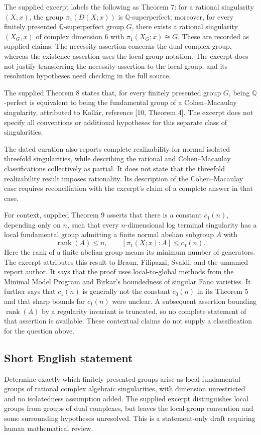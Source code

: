 \documentclass[11pt]{article}
\newcommand{\Q}{\mathbb{Q}}
\begin{document}
The supplied excerpt labels the following as Theorem 7: for a rational singularity \((X,x)\), the group \(\pi_1(D(X;x))\) is \(\Q\)-superperfect; moreover, for every finitely presented \(\Q\)-superperfect group \(G\), there exists a rational singularity \((X_G,x)\) of complex dimension \(6\) with \(\pi_1(X_G;x)\cong G\). These are recorded as supplied claims. The necessity assertion concerns the dual-complex group, whereas the existence assertion uses the local-group notation. The excerpt does not justify transferring the necessity assertion to the local group, and its resolution hypotheses need checking in the full source.

The supplied Theorem 8 states that, for every finitely presented group \(G\), being \(\Q\)-perfect is equivalent to being the fundamental group of a Cohen--Macaulay singularity, attributed to Koll\'ar, reference [10, Theorem 4]. The excerpt does not specify all conventions or additional hypotheses for this separate class of singularities.

The dated curation also reports complete realizability for normal isolated threefold singularities, while describing the rational and Cohen--Macaulay classifications collectively as partial. It does not state that the threefold realizability result imposes rationality. Its description of the Cohen--Macaulay case requires reconciliation with the excerpt's claim of a complete answer in that case.

For context, supplied Theorem 9 asserts that there is a constant \(c_1(n)\), depending only on \(n\), such that every \(n\)-dimensional log terminal singularity has a local fundamental group admitting a finite normal abelian subgroup \(A\) with
\[
\operatorname{rank}(A)\le n,
\qquad
[\pi_1(X;x):A]\le c_1(n).
\]
Here the rank of a finite abelian group means its minimum number of generators. The excerpt attributes this result to Braun, Filipazzi, Svaldi, and the unnamed report author. It says that the proof uses local-to-global methods from the Minimal Model Program and Birkar's boundedness of singular Fano varieties. It further says that \(c_1(n)\) is generally not the constant \(c_0(n)\) in its Theorem 5 and that sharp bounds for \(c_1(n)\) were unclear. A subsequent assertion bounding \(\operatorname{rank}(A)\) by a regularity invariant is truncated, so no complete statement of that assertion is available. These contextual claims do not supply a classification for the question above.
\subsection{Short English statement}
Determine exactly which finitely presented groups arise as local fundamental groups of rational complex algebraic singularities, with dimension unrestricted and no isolatedness assumption added. The supplied excerpt distinguishes local groups from groups of dual complexes, but leaves the local-group convention and some surrounding hypotheses unresolved. This is a statement-only draft requiring human mathematical review.
\end{document}
